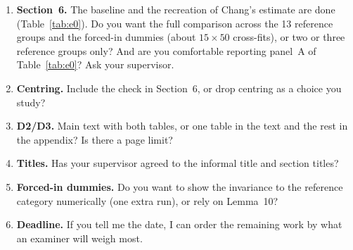 \documentclass[11pt]{article}
\theoremstyle{plain}
\theoremstyle{remark}
\begin{document}
\begin{enumerate}
\item \textbf{Section~6.} The baseline and the recreation of Chang's estimate
  are done (Table~\ref{tab:e0}). Do you want the full comparison across the 13
  reference groups and the forced-in dummies (about $15\times50$ cross-fits), or
  two or three reference groups only? And are you comfortable reporting panel~A
  of Table~\ref{tab:e0}? Ask your supervisor.
\item \textbf{Centring.} Include the check in Section~6, or drop centring as a
  choice you study?
\item \textbf{D2/D3.} Main text with both tables, or one table in the text and
  the rest in the appendix? Is there a page limit?
\item \textbf{Titles.} Has your supervisor agreed to the informal title and
  section titles?
\item \textbf{Forced-in dummies.} Do you want to show the invariance to the
  reference category numerically (one extra run), or rely on Lemma~10?
\item \textbf{Deadline.} If you tell me the date, I can order the remaining work
  by what an examiner will weigh most.
\end{enumerate}

\printbibliography[title={References used in the inserts}]
\end{document}
